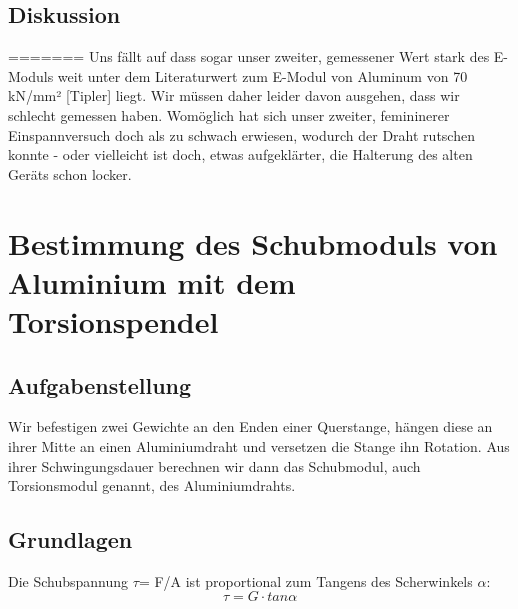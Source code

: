 \documentclass{article}
\begin{document}
\subsection{Diskussion}
\newpage
=======
Uns fällt auf dass sogar unser zweiter, gemessener Wert stark des E-Moduls weit unter dem
Literaturwert zum E-Modul von Aluminum von 70 kN/mm² [Tipler] liegt. Wir müssen daher leider davon ausgehen, dass wir schlecht gemessen haben. Womöglich hat sich unser zweiter, femininerer Einspannversuch doch als zu schwach erwiesen, wodurch der Draht rutschen konnte - oder vielleicht ist doch, etwas aufgeklärter, die Halterung des alten Geräts schon locker.

\section{Bestimmung des Schubmoduls von Aluminium mit dem Torsionspendel}
\subsection{Aufgabenstellung}
Wir befestigen zwei Gewichte an den Enden einer Querstange, hängen diese an ihrer Mitte an einen Aluminiumdraht und versetzen die Stange ihn Rotation. Aus ihrer Schwingungsdauer berechnen wir dann das Schubmodul, auch Torsionsmodul genannt, des Aluminiumdrahts.
\subsection{Grundlagen}
Die Schubspannung $\tau$= F/A ist proportional zum Tangens des Scherwinkels $\alpha$:
$$ \tau = G\cdot	tan\alpha$$
\end{document}
